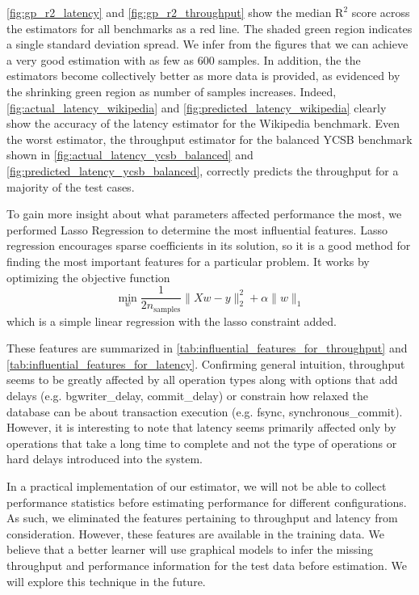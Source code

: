 \cref{fig:gp_r2_latency} and \cref{fig:gp_r2_throughput} show the
median $\textrm{R}^2$ score across the estimators for all benchmarks
as a red line. The shaded green region indicates a single standard
deviation spread. We infer from the figures that we can achieve a very
good estimation with as few as 600 samples. In addition, the the
estimators become collectively better as more data is provided, as
evidenced by the shrinking green region as number of samples
increases. Indeed, \cref{fig:actual_latency_wikipedia} and
\cref{fig:predicted_latency_wikipedia} clearly show the accuracy of
the latency estimator for the Wikipedia benchmark. Even the worst
estimator, the throughput estimator for the balanced YCSB benchmark
shown in \cref{fig:actual_latency_ycsb_balanced} and
\cref{fig:predicted_latency_ycsb_balanced}, correctly predicts the
throughput for a majority of the test cases.

To gain more insight about what parameters affected performance the
most, we performed Lasso Regression to determine the most influential
features. Lasso regression encourages sparse coefficients in its
solution, so it is a good method for finding the most important
features for a particular problem. It works by optimizing the
objective function
\begin{equation*}
  \min\limits_{w}
  \frac{1}{2n_{\textrm{samples}}} \|Xw - y\|_2^2 + \alpha \|w\|_1
\end{equation*}
which is a simple linear regression with the lasso constraint added.

 These features are summarized in
\cref{tab:influential_features_for_throughput} and
\cref{tab:influential_features_for_latency}. Confirming general
intuition, throughput seems to be greatly affected by all operation
types along with options that add delays (e.g. bgwriter\_delay,
commit\_delay) or constrain how relaxed the database can be about
transaction execution (e.g. fsync, synchronous\_commit). However, it
is interesting to note that latency seems primarily affected only by
operations that take a long time to complete and not the type of
operations or hard delays introduced into the system.

In a practical implementation of our estimator, we will not be able
to collect performance statistics before estimating performance for
different configurations. As such, we eliminated the features
pertaining to throughput and latency from consideration. However,
these features are available in the training data. We believe that a
better learner will use graphical models to infer the missing
throughput and performance information for the test data before
estimation. We will explore this technique in the future.